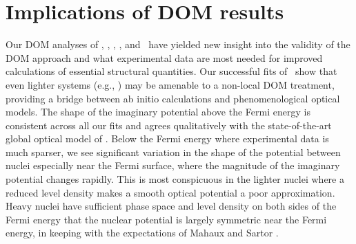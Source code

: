 \section{Implications of DOM results}
Our DOM analyses of \oSixEight, \caAughtEight, \niEightFour, \snTwelveFour,
and \pbEight\ have yielded new insight into the validity of the DOM approach
and what experimental data are most needed for improved calculations of
essential structural quantities. Our successful fits of \oSixEight\ show that
even lighter systems (e.g., \cTwelve) may be amenable to a non-local DOM
treatment, providing a bridge between ab initio calculations and
phenomenological optical models. The shape of the imaginary potential
above the Fermi energy is consistent across all our fits and agrees
qualitatively with the state-of-the-art global optical model of \cite{KoningDelaroche}. 
Below the Fermi energy where experimental data is much sparser, we see
significant variation in the shape of the potential between nuclei especially
near the Fermi surface, where the magnitude of the imaginary potential changes
rapidly. This is most conspicuous in the lighter nuclei where a reduced level density
makes a smooth optical potential a poor approximation.
Heavy nuclei have sufficient phase space and level density on both
sides of the Fermi energy that the nuclear potential is largely symmetric near
the Fermi energy, in keeping with the expectations of Mahaux and Sartor \cite{Mahaux1991}.

